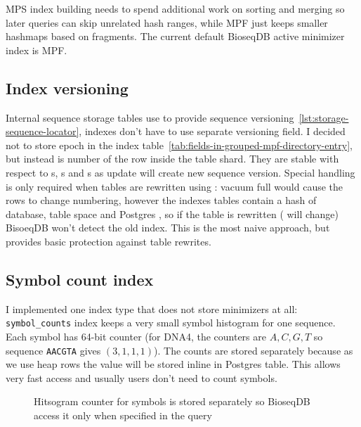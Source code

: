 MPS index building needs to spend additional work on sorting and merging so later queries can skip
unrelated hash ranges, while MPF just keeps smaller hashmaps based on fragments. 
The current default BioseqDB active minimizer index is MPF.

\subsection{Index versioning}
\label{sec:index-compatibility}

Internal sequence storage tables use  to provide sequence versioning~\ref{lst:storage-sequence-locator}, indexes don't have to use separate versioning field.
I decided not to store epoch in the index table~\ref{tab:fields-in-grouped-mpf-directory-entry}, but instead  is number of the row inside the 
table shard. They are stable with respect to s, s and s as update will create new sequence version. 
Special handling is only required when tables are rewritten using : vacuum full would cause the rows to change numbering, however
the indexes tables contain a hash of database, table space and Postgres , so if the table is rewritten ( will change) BisoeqDB won't detect the old index.
This is the most naive approach, but provides basic protection against table rewrites.


\subsection{Symbol count index}
\label{sec:index-symbol-counts}

I implemented one index type that does not store minimizers at all: \texttt{symbol\_counts}
index keeps a very small symbol histogram for one sequence.
Each symbol has 64-bit counter (for DNA4, the counters are $A,C,G,T$ so sequence
\texttt{AACGTA} gives $(3,1,1,1)$). The counts are stored separately because as we use heap rows the value will be stored inline in Postgres table.
This allows very fast access and usually users don't need to count symbols.

\begin{figure}[htbp]
\centering
{}
\caption{Hitsogram counter for symbols is stored separately so BioseqDB access it only when specified in the query}
\label{fig:index-symbol-counts}
\end{figure}

